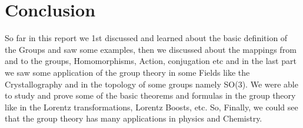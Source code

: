 \section{Conclusion}

So far in this report we 1st discussed and learned about the basic definition of the Groups and saw some examples, then we discussed about the mappings from and to the groups, Homomorphisms, Action, conjugation etc and in the last part we saw some application of the group theory in some Fields like the Crystallography and in the topology of some groups namely SO(3). We were able to study and prove some of the basic theorems and formulas in the group theory like in the Lorentz transformations, Lorentz Boosts, etc. So, Finally, we could see that the group theory has many applications in physics and Chemistry.